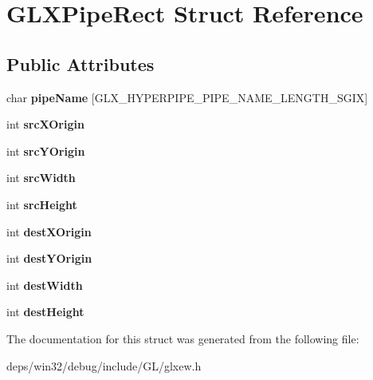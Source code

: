 \hypertarget{struct_g_l_x_pipe_rect}{}\section{G\+L\+X\+Pipe\+Rect Struct Reference}
\label{struct_g_l_x_pipe_rect}
\subsection*{Public Attributes}
\begin{DoxyCompactItemize}
\item 
\hypertarget{struct_g_l_x_pipe_rect_aa4c4f60e9647705ddefa10f95a37cb79}{}char {\bfseries pipe\+Name} \mbox{[}G\+L\+X\+\_\+\+H\+Y\+P\+E\+R\+P\+I\+P\+E\+\_\+\+P\+I\+P\+E\+\_\+\+N\+A\+M\+E\+\_\+\+L\+E\+N\+G\+T\+H\+\_\+\+S\+G\+I\+X\mbox{]}\label{struct_g_l_x_pipe_rect_aa4c4f60e9647705ddefa10f95a37cb79}

\item 
\hypertarget{struct_g_l_x_pipe_rect_a9df2313c01f75d149e64f2ff467bc266}{}int {\bfseries src\+X\+Origin}\label{struct_g_l_x_pipe_rect_a9df2313c01f75d149e64f2ff467bc266}

\item 
\hypertarget{struct_g_l_x_pipe_rect_a1f7316dff7050ab2ce9d3d37f8c5450e}{}int {\bfseries src\+Y\+Origin}\label{struct_g_l_x_pipe_rect_a1f7316dff7050ab2ce9d3d37f8c5450e}

\item 
\hypertarget{struct_g_l_x_pipe_rect_a2c6c180a4dabb71076366e06a1c7d0ef}{}int {\bfseries src\+Width}\label{struct_g_l_x_pipe_rect_a2c6c180a4dabb71076366e06a1c7d0ef}

\item 
\hypertarget{struct_g_l_x_pipe_rect_a35632524bce6bffa05f284a9b1c1b8ff}{}int {\bfseries src\+Height}\label{struct_g_l_x_pipe_rect_a35632524bce6bffa05f284a9b1c1b8ff}

\item 
\hypertarget{struct_g_l_x_pipe_rect_a8b7b941894ad3420326d7e9fa885bb71}{}int {\bfseries dest\+X\+Origin}\label{struct_g_l_x_pipe_rect_a8b7b941894ad3420326d7e9fa885bb71}

\item 
\hypertarget{struct_g_l_x_pipe_rect_aef7766b02ef07c20a11e89da5878b469}{}int {\bfseries dest\+Y\+Origin}\label{struct_g_l_x_pipe_rect_aef7766b02ef07c20a11e89da5878b469}

\item 
\hypertarget{struct_g_l_x_pipe_rect_a3c07991d2a8fb6e973eae834650b3dad}{}int {\bfseries dest\+Width}\label{struct_g_l_x_pipe_rect_a3c07991d2a8fb6e973eae834650b3dad}

\item 
\hypertarget{struct_g_l_x_pipe_rect_a858b0ea6642e451495aff35cfefbd083}{}int {\bfseries dest\+Height}\label{struct_g_l_x_pipe_rect_a858b0ea6642e451495aff35cfefbd083}

\end{DoxyCompactItemize}


The documentation for this struct was generated from the following file\+:\begin{DoxyCompactItemize}
\item 
deps/win32/debug/include/\+G\+L/glxew.\+h\end{DoxyCompactItemize}

